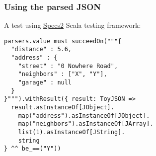 \begin{frame}[fragile]
  \frametitle{Using the parsed JSON}

  A test using \href{http://etorreborre.github.io/specs2/}{Specs2} Scala testing framework:

  \begin{verbatim}
parsers.value must succeedOn("""{
  "distance" : 5.6,
  "address" : {
    "street" : "0 Nowhere Road",
    "neighbors" : ["X", "Y"],
    "garage" : null
  }
}""").withResult({ result: ToyJSON =>
  result.asInstanceOf[JObject].
    map("address").asInstanceOf[JObject].
    map("neighbors").asInstanceOf[JArray].
    list(1).asInstanceOf[JString].
    string
} ^^ be_==("Y"))
  \end{verbatim}
\end{frame}

